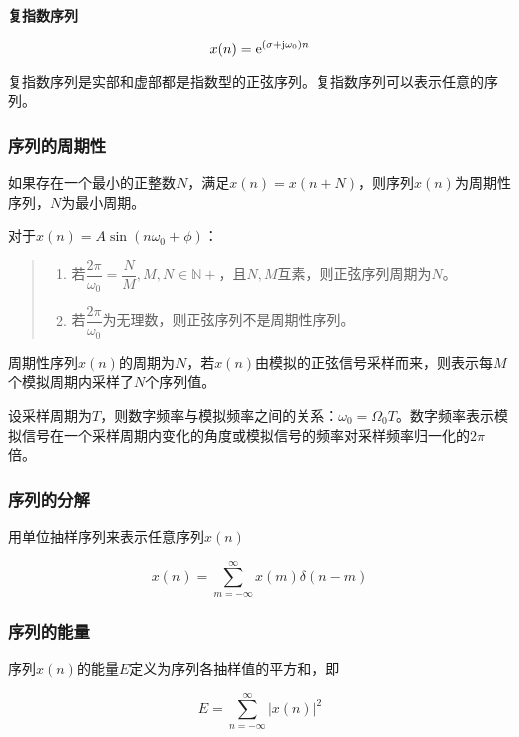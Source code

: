 \documentclass[cn, hazy, blue, normal, 14pt]{elegantnote}
\begin{document}
\textbf{复指数序列}

\begin{equation}
        x(n)={\rm{e}}^{(\sigma+{\rm{j}}\omega_0)n}
\end{equation}

复指数序列是实部和虚部都是指数型的正弦序列。复指数序列可以表示任意的序列。

\subsubsection{序列的周期性}

如果存在一个最小的正整数$N$，满足$x(n)=x(n+N)$，则序列$x(n)$为周期性序列，$N$为最小周期。

对于$x(n)=A\sin(n\omega_0+\phi)$：

\begin{quote}
\begin{enumerate}
    \item 若$\dfrac{2\pi}{\omega_0}=\dfrac{N}{M}, M,N\in\mathbb{N+}$，且$N, M$互素，则正弦序列周期为$N$。
    \item 若$\dfrac{2\pi}{\omega_0}$为无理数，则正弦序列不是周期性序列。
\end{enumerate}
\end{quote}

周期性序列$x(n)$的周期为$N$，若$x(n)$由模拟的正弦信号采样而来，则表示每$M$个模拟周期内采样了$N$个序列值。

设采样周期为$T$，则数字频率与模拟频率之间的关系：$\omega_0=\Omega_0T$。数字频率表示模拟信号在一个采样周期内变化的角度或模拟信号的频率对采样频率归一化的$2\pi$倍。

\subsubsection{序列的分解}

用单位抽样序列来表示任意序列$x(n)$

\begin{equation}
        x(n)=\sum_{m=-\infty}^{\infty}{x(m)\delta(n-m)}
\end{equation}

\subsubsection{序列的能量}

序列$x(n)$的能量$E$定义为序列各抽样值的平方和，即

\begin{equation}
        E=\sum_{n=-\infty}^{\infty}{|x(n)|^2}
\end{equation}
\end{document}
